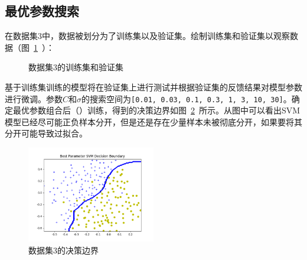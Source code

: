 \documentclass{SEU-AI-Report}
\begin{document}
\subsection{最优参数搜索}

在数据集3中，数据被划分为了训练集以及验证集。绘制训练集和验证集以观察数据（图~\ref{fig:dataset3}~）：
\begin{figure}[htbp]
    \centering
    \hfill
    \caption{数据集3的训练集和验证集}
    \label{fig:dataset3}
\end{figure}

基于训练集训练的模型将在验证集上进行测试并根据验证集的反馈结果对模型参数进行微调。参数$C$和$\sigma$的搜索空间为\texttt{[0.01, 0.03, 0.1, 0.3, 1, 3, 10, 30]}。确定最优参数组合后（）训练，得到的决策边界如图~\ref{fig:result3}~所示。从图中可以看出SVM模型已经尽可能正负样本分开，但是还是存在少量样本未被彻底分开，如果要将其分开可能导致过拟合。
\begin{figure}[htbp]
    \centering
    \includegraphics[width=0.5\textwidth]{figure/fig7.png}
    \caption{数据集3的决策边界}
    \label{fig:result3}
\end{figure}
\end{document}
